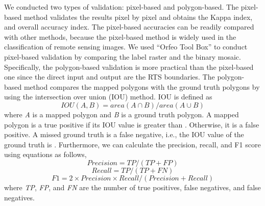 \documentclass[authoryear,preprint,review,12pt]{elsarticle}
\begin{document}
We conducted two types of validation: pixel-based and polygon-based. The pixel-based method validates the results pixel by pixel and obtains the Kappa index, and overall accuracy index. The pixel-based accuracies can be readily compared with other methods, because the pixel-based method is widely used in the classification of remote sensing images. We used ``Orfeo Tool Box'' \citep{inglada2009orfeo} to conduct pixel-based validation by comparing the label raster and the binary mosaic. Specifically, the polygon-based validation is more practical than the pixel-based one since the direct input and output are the RTS boundaries. The polygon-based method compares the mapped polygons with the ground truth polygons by using the intersection over union (IOU) method.  IOU is defined as 
\begin{equation}
IOU(A,B)=area(A \cap B)/area(A \cup B)
\label{equ_iou}
\end{equation}
where \emph{A} is a mapped polygon and \emph{B} is a ground truth polygon.  A mapped polygon is a true positive if its IOU value is greater than . Otherwise, it is a false positive. A missed ground truth is a false negative, i.e., the IOU value of the ground truth  is .  Furthermore, we can calculate the precision, recall, and F1 score using equations as follows,
\begin{equation}
Precision=TP/(TP+FP)
\label{equ_precision}
\end{equation}
\begin{equation}
Recall=TP/(TP+FN)
\label{equ_recall}
\end{equation}
\begin{equation}
F1=2 \times Precision \times Recall / (Precision + Recall)
\label{equ_f1score}
\end{equation}
where \emph{TP}, \emph{FP}, and \emph{FN} are the number of true positives, false negatives, and false negatives. 
\end{document}
